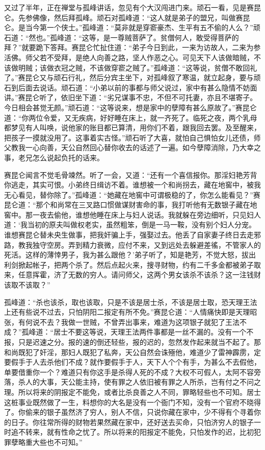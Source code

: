 \documentclass[a4paper,12pt,UTF8,twoside]{ctexbook}
\begin{document}
又过了半年，正在禅堂与孤峰讲话，忽见有个大汉闯进门来。顽石一看，见是赛昆仑。先参佛像，然后拜孤峰。顽石对孤峰道：“这人就是弟子的盟兄，叫做赛昆仑。是当今第一个侠士。”孤峰道：“莫非就是穿窬豪杰、生平有五不偷的人么？”顽石道：“然也。”孤峰道：“这等，是一尊贼菩萨了。贫僧何人，敢受得菩萨的拜？”就要跪下答拜。赛昆仑忙扯住道：“弟子今日到此，一来为访故人，二来为参活佛。师父若不受拜，是绝人向善之路，坚人作恶之心。可见天下人该做暗贼，不该做明贼；该做衣冠之贼，不该做穿窬之贼了。”孤峰道：“这等说，贫僧不敢回礼了。”赛昆仑又与顽石行礼，然后分宾主坐下，对孤峰叙了寒温，就立起身，要与顽石到后面去说话。顽石道：“小弟以前的事都与师父说过，家中有甚么隐情不妨面讲。”赛昆仑听了，依旧坐下道：“劣兄谋事不忠，不但不可托妻，亦且不堪寄子。今日相会甚觉无颜。”顽石道：“这等说来，想是家中的孽障有甚么原故了。”赛昆仑道：“你两位令爱，又无疾病，好好睡在床上，就一齐死了。临死之夜，两个乳母都梦见有人叫唤，说他家的账目都已算清，用你们不着，跟我回去罢。及至醒来，把孩子一摸就没用了。这事着实古怪。”顽石听了大喜，就怕自己惧怕女儿还债，师父教我一心向善，天公自然回心替你收去的话述了一遍。如今孽障消除，乃大幸之事，老兄怎么说起负托的话来。

赛昆仑闻言不觉毛骨竦然。听了一会，又道：“还有一个喜信报你。那淫妇艳芳背你逃走，其实可恨。小弟终日缉访不着。谁想被一个和尚拐去，藏在地窖中，被我无心看见，替你除了。”孤峰道：“她藏在地窖中可谓极稳的了，你怎么能看见？”赛昆仑道：“那个和尚常在三叉路口惯做谋财害命的事，我打听他有无数银子藏在地窖中。那一夜去偷他，谁想他睡在床上与妇人说话。我就躲在旁边细听，只见妇人道：‘我当初的原夫叫做权老实，虽然粗笨，倒是一马一鞍，没有别个妇人分宠。谁想赛昆仑替未央生做事，把我奸骗上手，强娶过去。他丢了自家妻子终日去走邪路，教我独守空房。弄到精力衰微，应付不来，又到远处去躲避差徭，不管家人的死活。这样的薄悻男子，我为甚么跟他？’弟子听了，知是艳芳，不觉大怒，拔出利剑掀起帐子，把两个杀了。然后点起火来，搜寻财物，约有二千多金都被弟子取来，任意挥霍，济了无数的穷人。请问师父，这两个男女该杀不该杀？这一注钱财该取不该取？”

孤峰道：“杀也该杀，取也该取，只是不该是居士杀，不该是居士取，恐天理王法上还有些说不过去，只怕阴阳二报定有所不免。”赛昆仑道：“人情痛快即是天理昭张，有何说不去？我做一世贼，不曾弄出事来，难道为这项银子就犯了王法不成？”孤峰道：“居士不要这等说，天理王法两件事都是一丝不漏的。没有一个不报，只是迟速之分。报的速的倒还轻些，报的迟的，忽然发作起来就当不起了。那和尚既犯了奸淫，那妇人既犯了私奔，天公自然会诛殛他，难道少了雷神霹雳，定要假手于人去杀他们不成？就作要假手于人，天下人个个有手，为甚么不去假他，单要借重你一个？难道只有你这手是杀得人死的不成？大权不可假人，太阿不容旁落，杀人的大事，天公能主持，使有罪之人依旧被有罪之人所杀，岂有付之不问之理。所以将来的阴报定不能免，或者比杀良善之人不同，罪略轻些也不可知。居士这桩事业既然做了一生，料想你的大名是没有一个衙门不知，没有一个官府不晓得了。你偷来的银子虽然济了穷人，别人不信，只说你藏在家中，少不得有个寻着你的日子。你往常所得的财物若果然藏在家中，还好送去买命，只怕济穷人的银子一时追不转来，就有性命之忧了。所以将来的阳报定不能免，只怕发作的迟，比初犯罪孽略重大些也不可知。”
\end{document}
